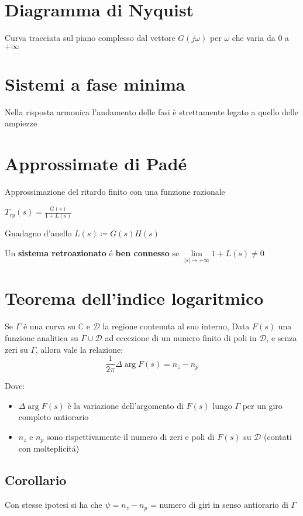 \documentclass{article}
\begin{document}
\section{Diagramma di Nyquist}
Curva tracciata sul piano complesso dal vettore $G(j\omega)$ per $\omega$ che varia da 0 a $+\infty$

\section{Sistemi a fase minima}
Nella risposta armonica l'andamento delle fasi \`e strettamente legato a quello delle ampiezze

\section{Approssimate di Pad\'e}
Approssimazione del ritardo finito con una funzione razionale


$T_{ry}(s) = \frac{G(s)}{1 + L(s)}$

Guadagno d'anello $L(s) \coloneqq G(s)H(s)$

Un \textbf{sistema retroazionato} \'e \textbf{ben connesso} se $\lim\limits_{|s| \to +\infty} 1 + L(s) \neq 0$

\section{Teorema dell'indice logaritmico}
Se $\Gamma$ \'e una curva su $\mathbb{C}$ e $\mathcal{D}$ la regione contenuta al suo interno, Data $F(s)$ una funzione analitica  su $\Gamma \cup \mathcal{D}$ ad eccezione di un numero finito di poli in $\mathcal{D}$, e senza zeri su $\Gamma$, allora vale la relazione:
\[\frac{1}{2\pi} \Delta \arg F(s) = n_z - n_p \]

Dove:
\begin{itemize}
    \item $\Delta\arg F(s)$ \`e la variazione dell'argomento di $F(s)$ lungo $\Gamma$ per un giro completo antiorario
    \item $n_z$ e $n_p$ sono rispettivamente il numero di zeri e poli di $F(s)$ su $\mathcal{D}$ (contati con molteplicit\'a)
\end{itemize}

\subsection{Corollario\label{corollario_logaritmo}}
Con stesse ipotesi si ha che $\psi = n_z - n_p$ = numero di giri in senso antiorario di $\Gamma$
\end{document}
